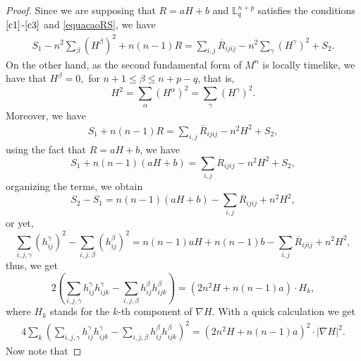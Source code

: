 \documentclass[leqno,11pt]{amsart}
\theoremstyle{plain}
\theoremstyle{definition}
\numberwithin{equation}{section}
\begin{document}
\begin{proof} 

Since we are supposing that $R=aH+b$ and $\mathbb{L}_{q}^{n+p}$ satisfies the conditions $\eqref{c1}$-$\eqref{c3}$ and \eqref{equacaoRS}, we have
\begin{eqnarray*}
S_1-n^2\sum_{\beta}(H^{\beta})^2+n(n-1)R=\sum_{i,j}\overline{R}_{ijij}-n^2\sum_{\gamma}(H^{\gamma})^2+S_2.
\end{eqnarray*}
On the other hand, as the second fundamental form of $M^n$ is locally timelike, we have that $H^{\beta}=0,$ for $n+1\leq \beta\leq n+p-q$, that is, 
$$H^2=\sum_{\alpha}(H^{\alpha})^2=\sum_{\gamma}(H^{\gamma})^2.$$ 
Moreover, we have
\begin{eqnarray*}
S_1+n(n-1)R=\sum_{i,j}\overline{R}_{ijij}-n^2H^2+S_2,
\end{eqnarray*}
using the fact that $R=aH+b$, we have
$$
S_1+n(n-1)(aH+b)=\sum_{i,j}\overline{R}_{ijij}-n^2H^2+S_2,
$$
organizing the terms, we obtain
$$
S_2-S_1=n(n-1)(aH+b)-\sum_{i,j}\overline{R}_{ijij}+n^2H^2,
$$
or yet,
$$
\sum_{i,j,\gamma}(h_{ij}^{\gamma})^2-\sum_{i,j,\beta}(h_{ij}^{\beta})^2=n(n-1)aH+n(n-1)b-\sum_{i,j}\overline{R}_{ijij}+n^2H^2,
$$
thus, we get
\begin{equation}\label{L0}
2\left(\sum_{i,j,\gamma}h_{ij}^{\gamma}h_{ijk}^{\gamma}-\sum_{i,j,\beta}h_{ij}^{\beta}h_{ijk}^{\beta}\right)=(2n^2H+n(n-1)a)\cdot H_k,
\end{equation}
where $H_k$ stands for the $k$-th component of $\nabla H.$ With a quick calculation we get
\begin{eqnarray*}
4\sum_{k}\left(\sum_{i,j,\gamma}h_{ij}^{\gamma}h_{ijk}^{\gamma}-\sum_{i,j,\beta}h_{ij}^{\beta}h_{ijk}^{\beta}\right)^2=(2n^2H+n(n-1)a)^2\cdot |\nabla H|^2.
\end{eqnarray*}
Now note that 


\end{proof}
\end{document}
